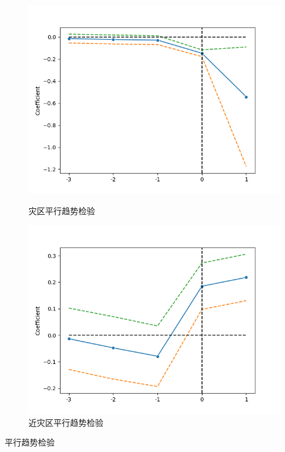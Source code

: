 \begin{figure}[H]
    \begin{minipage}{0.48\linewidth}
        \includegraphics[width=\linewidth]{lib/img/robust_Disaster.png}
        \caption{灾区平行趋势检验}\label{fig:robust}
    \end{minipage}
    \begin{minipage}{0.48\linewidth}
        \includegraphics[width=\linewidth]{lib/img/robust_Neighbor.png}
        \caption{近灾区平行趋势检验}\label{fig:robust2}
    \end{minipage}
\end{figure}
\begin{table}[H]
    \centering
    \caption{平行趋势检验}\label{tab:robust}
    
\end{table}

